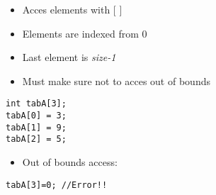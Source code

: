\documentclass[10pt]{beamer}
\begin{document}
\begin{frame}[fragile]
\begin{columns}
\begin{column}{0.65\textwidth}
    \end{column}
    \begin{column}{0.5\textwidth}
\begin{itemize}
  \item Acces elements with [ ]
  \item Elements are indexed from 0
  \item Last element is \textit{size-1}
  \item Must make sure not to acces out of bounds
\end{itemize}

\begin{lstlisting}
int tabA[3];
tabA[0] = 3;
tabA[1] = 9;
tabA[2] = 5;
\end{lstlisting}
\begin{itemize}
  \item Out of bounds access:
\end{itemize}
\begin{lstlisting}
tabA[3]=0; //Error!!
\end{lstlisting}

    \end{column}
  \end{columns}
\end{frame}
\end{document}
